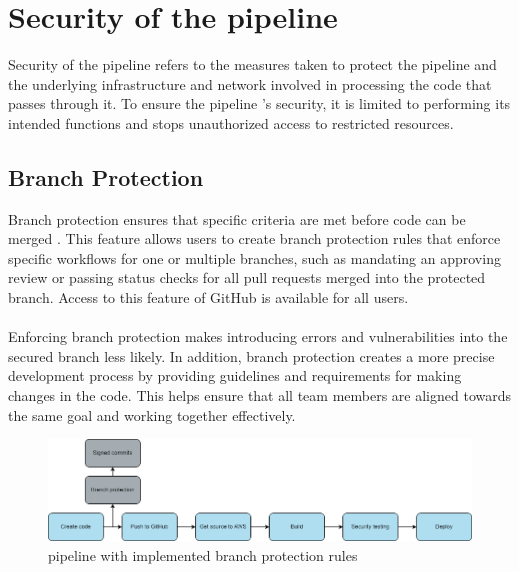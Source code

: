 \section{Security of the pipeline}
\label{Security of the pipeline}
Security of the \gls{pipeline} refers to the measures taken to protect the \gls{pipeline} and the underlying infrastructure and network involved in processing the code that passes through it. To ensure the \gls{pipeline} 's security, it is limited to performing its intended functions and stops unauthorized access to restricted resources.

\subsection{Branch Protection}
Branch protection ensures that specific criteria are met before code can be merged \cite{branch}. This feature allows users to create branch protection rules that enforce specific workflows for one or multiple branches, such as mandating an approving review or passing status checks for all pull requests merged into the protected branch. Access to this feature of GitHub is available for all users.
\\~\\
Enforcing branch protection makes introducing errors and vulnerabilities into the secured branch less likely. In addition, branch protection creates a more precise development process by providing guidelines and requirements for making changes in the code. This helps ensure that all team members are aligned towards the same goal and working together effectively.  


\vspace{2mm}
\begin{figure}[H]
    \centering
    \includegraphics[width=0.8\columnwidth]{Images/pipeline6.png}
    \caption{\gls{pipeline} with implemented branch protection rules}
    \label{fig: Pipeline with implemented branch protection rules}
\end{figure}

